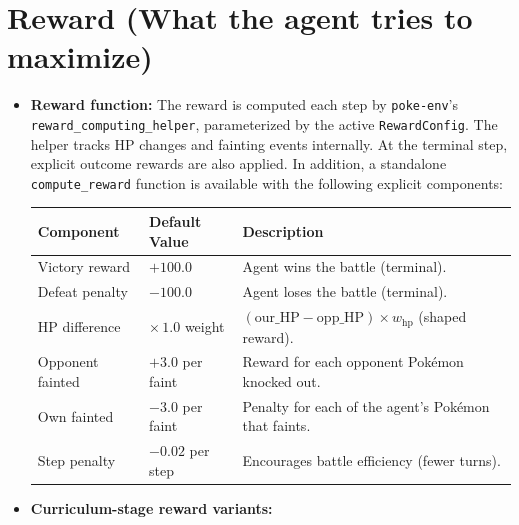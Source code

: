 \documentclass[11pt, a4paper]{article}
\begin{document}
\section{Reward (What the agent tries to maximize)}
\begin{itemize}
    \item \textbf{Reward function:}
        The reward is computed each step by \texttt{poke-env}'s \texttt{reward\_computing\_helper}, parameterized by the active \texttt{RewardConfig}. The helper tracks HP changes and fainting events internally. At the terminal step, explicit outcome rewards are also applied. In addition, a standalone \texttt{compute\_reward} function is available with the following explicit components:

        \begin{center}
        \small
        \begin{tabularx}{\textwidth}{l l X}
            \toprule
            \textbf{Component} & \textbf{Default Value} & \textbf{Description} \\
            \midrule
            Victory reward     & $+100.0$              & Agent wins the battle (terminal). \\
            Defeat penalty     & $-100.0$              & Agent loses the battle (terminal). \\
            HP difference      & $\times\,1.0$ weight  & $(\text{our\_HP} - \text{opp\_HP}) \times w_{\text{hp}}$ (shaped reward). \\
            Opponent fainted   & $+3.0$ per faint      & Reward for each opponent Pok\'{e}mon knocked out. \\
            Own fainted        & $-3.0$ per faint      & Penalty for each of the agent's Pok\'{e}mon that faints. \\
            Step penalty       & $-0.02$ per step      & Encourages battle efficiency (fewer turns). \\
            \bottomrule
        \end{tabularx}
        \end{center}

    \item \textbf{Curriculum-stage reward variants:}


\end{itemize}
\end{document}
